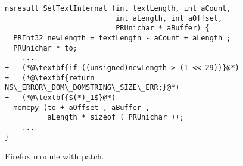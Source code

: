 \begin{figure}
\centering
\begin{lstlisting}
nsresult SetTextInternal (int textLength, int aCount,
                          int aLength, int aOffset,
                          PRUnichar * aBuffer) {
  PRInt32 newLength = textLength - aCount + aLength ;
  PRUnichar * to;
    ...
+   (*@\textbf{if ((unsigned)newLength > (1 << 29))}@*)
+   (*@\textbf{return NS\_ERROR\_DOM\_DOMSTRING\_SIZE\_ERR;}@*)
+   (*@\textbf{$(*)_1$}@*)
  memcpy (to + aOffset , aBuffer ,
          aLength * sizeof ( PRUnichar ));
    ...
}
\end{lstlisting}
%
\caption{Firefox  module with patch.}
\end{figure} 
